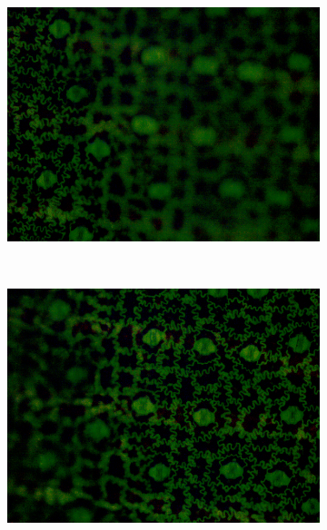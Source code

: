 \begin{figure}[ht]
    \centering
    \caption{Examples of \textit{Cthenante oppenheimiana} partially blurred images, with the leftmost (a) and rightmost parts (b) as sharp due to topological height differences.}
    \label{fig:ctenanthe_blur}
    \begin{subfigure}[t]{0.45\textwidth}
        \centering
        \includegraphics[scale=0.31]{images/cthenante_left.png}
        \caption{}
    \end{subfigure}%
    ~ 
    \begin{subfigure}[t]{0.45\textwidth}
        \centering
        \includegraphics[scale=0.31]{images/cthenante_right.png}
        \caption{}
    \end{subfigure}
    \centering
    \fautor
\end{figure}

